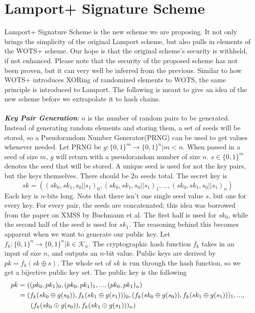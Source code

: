 \documentclass[]{scrartcl}
\makeatletter
\newcommand{\mathleft}{\@fleqntrue\@mathmargin0pt}
\makeatother
\begin{document}
\section*{Lamport+ Signature Scheme}
Lamport+ Signature Scheme is the new scheme we are proposing. It not only brings the simplicity of the original Lamport scheme, but also pulls in elements of the WOTS+ scheme. Our hope is that the original scheme's security is withheld, if not enhanced. Please note that the security of the proposed scheme has not been proven, but it can very well be inferred from the previous. Similar to how WOTS+ introduces XORing of randomized elements to WOTS, the same principle is introduced to Lamport. The following is meant to give an idea of the new scheme before we extrapolate it to hash chains.\\ \\
\textbf{\textit{Key Pair Generation}}: $n$ is the number of random pairs to be generated. Instead of generating random elements and storing them, a set of seeds will be stored, so a Pseudorandom Number Generator(PRNG) can be used to get values whenever needed. Let PRNG be $g : \{0,1\}^m \rightarrow \{0,1\}^n | m < n$. When passed in a seed of size $m$, $g$ will return with a pseudorandom number of size $n$. $s \in \{0,1\}^m$ denotes the seed that will be stored. A unique seed is used for not the key pairs, but the keys themselves. There should be $2n$ seeds total. The secret key is 
\mathleft
\begin{equation}
sk = ((sk_0, sk_1, s_0||s_1)_0,(sk_0, sk_1, s_0||s_1)_1,...,(sk_0, sk_1, s_0||s_1)_n) 
\end{equation}
Each key is $n$-bits long. Note that there isn't one single seed value $s$, but one for every key. For every pair, the seeds are concatenated; this idea was borrowed from the paper on XMSS by Buchmann et al. The first half is used for $sk_0$, while the second half of the seed is used for $sk_1$. The reasoning behind this becomes apparent when we want to generate our public key. Let $f_k : \{0,1\}^n \rightarrow \{0,1\}^n | k \in \mathcal{K}_n$. The cryptographic hash function $f_k$ takes in an input of size $n$, and outputs an $n$-bit value. Public keys are derived by $pk = f_k(sk \oplus s)$. The whole set of $sk$ is run through the hash function, so we get a bijective public key set. The public key is the following 
\mathleft
\begin{equation}
	\begin{split}
		pk & = ((pk_0, pk_1)_0,(pk_0, pk_1)_1,...,(pk_0, pk_1)_n) \\
		& = (f_k(sk_0 \oplus g(s_0)), f_k(sk_1 \oplus g(s_1)))_0,(f_k(sk_0 \oplus g(s_0)), f_k(sk_1 \oplus g(s_1)))_1,...,\\
		& \hspace{0.65cm}(f_k(sk_0 \oplus g(s_0)), f_k(sk_1 \oplus g(s_1)))_n) 
	\end{split}
\end{equation} \\
\end{document}
